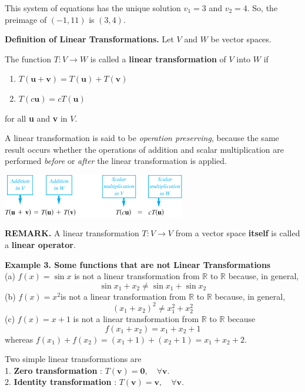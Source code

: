 \documentclass{article}
\newcommand\B{\textbf}
\newcommand\R{\mathbb{R}}
\newcounter{Def}[section]
\begin{document}
    This system of equations has the unique solution $v_1 = 3$ and $v_2 = 4$. So, the preimage of $(-1, 11)$ is $(3, 4)$.

    \begin{tcolorbox}[colback = {blue9}]
        \textbf{Definition of Linear Transformations.} Let $V$ and $W$ be vector spaces.

        The function $T: V \to W$ is called a \textbf{linear transformation} of $V$ into $W$ if
        \begin{enumerate}
            \item $T(\B{u} + \B{v}) = T(\B{u}) + T(\B{v})$
            \item $T(c\B{u}) = cT(\B{u})$
        \end{enumerate}
        for all \B{u} and \B{v} in $V$.
    \end{tcolorbox}
    A linear transformation is said to be \textit{operation preserving}, because the same result occurs whether the operations
    of addition and scalar multiplication are performed \textit{before} or \textit{after} the linear transformation is applied.
    \begin{center}
        \includegraphics[width = 8cm]{images/pro1.png}
    \end{center}
    \textbf{REMARK.} A linear transformation $T: V \to V$ from a vector space \textbf{itself} is called a \textbf{linear operator}.

    \textbf{Example 3. \textcolor{blue5}{Some functions that are not Linear Transformations}}\\
    (a) $f(x) = \sin{x}$ is not a linear transformation from $\R$ to $\R$ because, in general,
    \[ \sin{x_1 + x_2} \ne \sin{x_1} + \sin{x_2}\]
    (b) $f(x) = x^2$is not a linear transformation from $\R$ to $\R$ because, in general,
    \[(x_1 + x_2)^2 \ne x_1^2 + x_2^2\]
    (c) $f(x) = x + 1$ is not a linear transformation from $\R$ to $\R$ because
    \[f(x_1 + x_2) = x_1 + x_2 + 1\]
    whereas $f(x_1) + f(x_2) = (x_1 + 1) + (x_2 + 1) = x_1 + x_2 + 2$.

    Two simple linear transformations are\\
    1. \textbf{Zero transformation} : $T(\B{v}) = \B{0},\quad \forall \B{v}$.\\
    2. \textbf{Identity transformation} : $T(\B{v}) = \B{v},\quad \forall \B{v}$.
\end{document}
